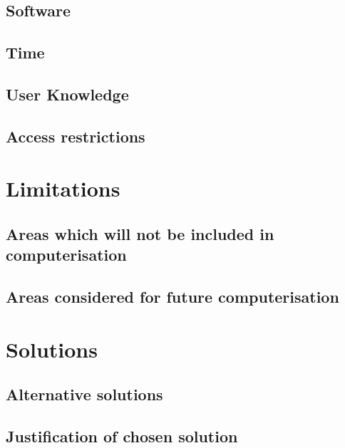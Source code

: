 \subsection{Software}

\subsection{Time}

\subsection{User Knowledge}

\subsection{Access restrictions}

\section{Limitations}

\subsection{Areas which will not be included in computerisation}

\subsection{Areas considered for future computerisation}

\section{Solutions}

\subsection{Alternative solutions}

\subsection{Justification of chosen solution}
